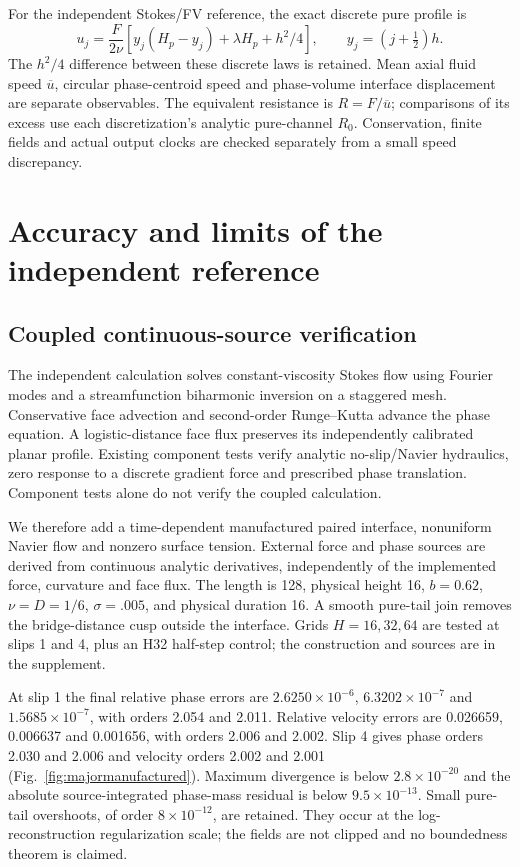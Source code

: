 \documentclass[preprint,12pt]{elsarticle}
\begin{document}
For the independent Stokes/FV reference, the exact discrete pure profile is
\begin{equation}\label{eq:fvpure}
 u_j=\frac{F}{2\nu}[y_j(H_p-y_j)+\lambda H_p+h^2/4],
 \qquad y_j=(j+\tfrac12)h.
\end{equation}
The $h^2/4$ difference between these discrete laws is retained.
Mean axial fluid speed $\overline u$, circular phase-centroid speed and
phase-volume interface displacement are separate observables.
The equivalent resistance is $R=F/\overline u$; comparisons of its excess
use each discretization's analytic pure-channel $R_0$.
Conservation, finite fields and actual output clocks are checked separately
from a small speed discrepancy.



\section{Accuracy and limits of the independent reference}
\subsection{Coupled continuous-source verification}
The independent calculation solves constant-viscosity Stokes flow using
Fourier modes and a streamfunction biharmonic inversion on a staggered mesh. Conservative
face advection and second-order Runge--Kutta advance the phase equation.
A logistic-distance face flux preserves its independently calibrated planar
profile. Existing component tests verify analytic no-slip/Navier hydraulics,
zero response to a discrete gradient force and prescribed phase translation.
Component tests alone do not verify the coupled calculation.

We therefore add a time-dependent manufactured paired interface, nonuniform
Navier flow and nonzero surface tension. External force and phase sources
are derived from continuous analytic derivatives, independently of the
implemented force, curvature and face flux. The length is 128, physical
height 16, $b=0.62$, $\nu=D=1/6$, $\sigma=.005$, and physical duration 16.
A smooth pure-tail join removes the bridge-distance cusp outside the
interface. Grids $H=16,32,64$ are tested at slips 1 and 4, plus an H32
half-step control; the construction and sources are in the supplement.

At slip 1 the final relative phase errors are
$2.6250\times10^{-6}$, $6.3202\times10^{-7}$ and $1.5685\times10^{-7}$,
with orders 2.054 and 2.011. Relative velocity errors are 0.026659,
0.006637 and 0.001656, with orders 2.006 and 2.002.
Slip 4 gives phase orders 2.030 and 2.006 and velocity orders 2.002 and
2.001 (Fig.~\ref{fig:majormanufactured}).
Maximum divergence is below $2.8\times10^{-20}$ and the absolute
source-integrated phase-mass residual is below $9.5\times10^{-13}$.
Small pure-tail overshoots, of order $8\times10^{-12}$, are retained.
They occur at the log-reconstruction regularization scale; the fields are
not clipped and no boundedness theorem is claimed.
\end{document}

